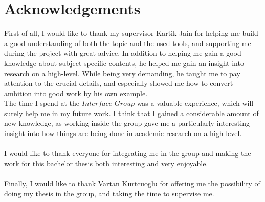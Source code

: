 
\section{Acknowledgements}
\label{s:Acknowledgements}

First of all, I would like to thank my supervisor Kartik Jain for helping me build a good understanding of both the topic and the used tools, and supporting me during the project with great advice. In addition to helping me gain a good knowledge about subject-specific contents, he helped me gain an insight into research on a high-level. While being very demanding, he taught me to pay attention to the crucial details, and especially showed me how to convert ambition into good work by his own example.
\\The time I spend at the $Interface$ $Group$ was a valuable experience, which will surely help me in my future work. I think that I gained a considerable amount of new knowledge, as working inside the group gave me a particularly interesting insight into how things are being done in academic research on a high-level.\\
\\I would like to thank everyone for integrating me in the group and making the work for this bachelor thesis both interesting and very enjoyable.\\
\\Finally, I would like to thank Vartan Kurtcuoglu for offering me the possibility of doing my thesis in the group, and taking the time to supervise me.